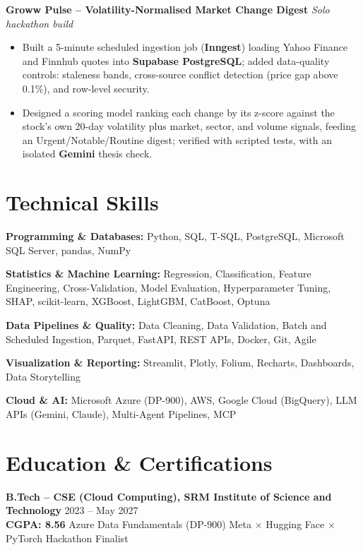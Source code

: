 \documentclass[11pt]{extarticle}
\begin{document}
\vspace{3pt}

\textbf{Groww Pulse -- Volatility-Normalised Market Change Digest}
\hfill \textit{Solo hackathon build}

\begin{itemize}
    \item Built a 5-minute scheduled ingestion job (\textbf{Inngest}) loading Yahoo Finance and Finnhub quotes into \textbf{Supabase PostgreSQL}; added data-quality controls: staleness bands, cross-source conflict detection (price gap above 0.1\%), and row-level security.
    \item Designed a scoring model ranking each change by its z-score against the stock's own 20-day volatility plus market, sector, and volume signals, feeding an Urgent/Notable/Routine digest; verified with scripted tests, with an isolated \textbf{Gemini} thesis check.
\end{itemize}


\section*{Technical Skills}

{\small

\textbf{Programming \& Databases:} Python, SQL, T-SQL, PostgreSQL, Microsoft SQL Server, pandas, NumPy

\textbf{Statistics \& Machine Learning:} Regression, Classification, Feature Engineering, Cross-Validation, Model Evaluation, Hyperparameter Tuning, SHAP, scikit-learn, XGBoost, LightGBM, CatBoost, Optuna

\textbf{Data Pipelines \& Quality:} Data Cleaning, Data Validation, Batch and Scheduled Ingestion, Parquet, FastAPI, REST APIs, Docker, Git, Agile

\textbf{Visualization \& Reporting:} Streamlit, Plotly, Folium, Recharts, Dashboards, Data Storytelling

\textbf{Cloud \& AI:} Microsoft Azure (DP-900), AWS, Google Cloud (BigQuery), LLM APIs (Gemini, Claude), Multi-Agent Pipelines, MCP

}


\section*{Education \& Certifications}

\textbf{B.Tech -- CSE (Cloud Computing), SRM Institute of Science and Technology}
\hfill 2023 -- May 2027 \\
\textbf{CGPA: 8.56} \quad\textbar\quad
Azure Data Fundamentals (DP-900) \quad\textbar\quad
Meta $\times$ Hugging Face $\times$ PyTorch Hackathon Finalist
\end{document}
